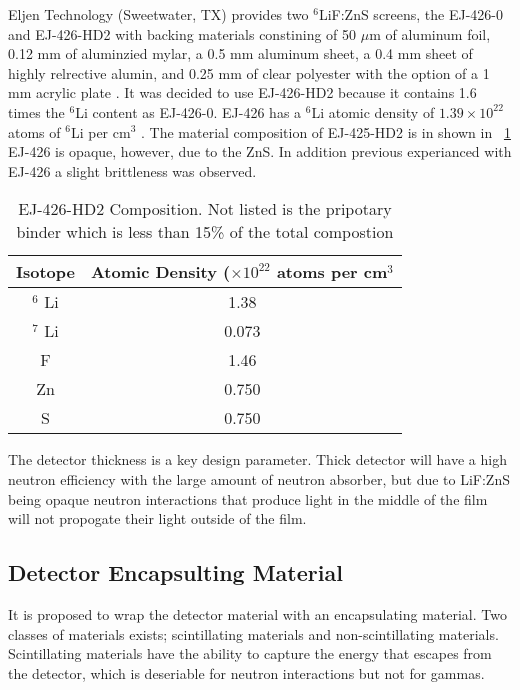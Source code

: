 Eljen Technology (Sweetwater, TX) provides two ${}^6$LiF:ZnS screens, the EJ-426-0 and EJ-426-HD2 with backing materials constining of 50 $\mu$m of aluminum foil, 0.12 mm of aluminzied mylar, a 0.5 mm aluminum sheet, a 0.4 mm sheet of highly relrective alumin, and 0.25 mm of clear polyester with the option of a 1 mm acrylic plate \cite{_ej-426_2012}.
It was decided to use EJ-426-HD2 because it contains 1.6 times the ${}^{6}$Li content as EJ-426-0. EJ-426 has a ${}^{6}$Li atomic density of $1.39\times10^{22}$ atoms of ${}^6$Li per cm${}^3$ \cite{eljen_ej-426_2012}. 
The material composition of EJ-425-HD2 is in shown in ~\ref{tab:EJ426Composition}
EJ-426 is opaque, however, due to the ZnS.  In addition previous experianced with EJ-426 a slight brittleness was observed.
\begin{table}
    \centering
    \begin{tabular}{c|c}
        Isotope & Atomic Density ($\times 10^{22}$ atoms per cm${}^3$ \\
        \hline
        $ {}^6 $ Li & 1.38 \\
        $ {}^7 $ Li & 0.073 \\
        F & 1.46 \\
        Zn & 0.750 \\
        S & 0.750 \\
    \end{tabular}
    \label{tab:EJ426Composition}
    \caption{EJ-426-HD2 Composition.  Not listed is the pripotary binder which is less than 15\% of the total compostion \cite{urffer_ej_2012}}
\end{table}
The detector thickness is a key design parameter. 
Thick detector will have a high neutron efficiency with the large amount of neutron absorber, but due to LiF:ZnS being opaque neutron interactions that produce light in the middle of the film will not propogate their light outside of the film.

\subsection{Detector Encapsulting Material}
It is proposed to wrap the detector material with an encapsulating material.
Two classes of materials exists; scintillating materials and non-scintillating materials.  
Scintillating materials have the ability to capture the energy that escapes from the detector, which is deseriable for neutron interactions but not for gammas.

